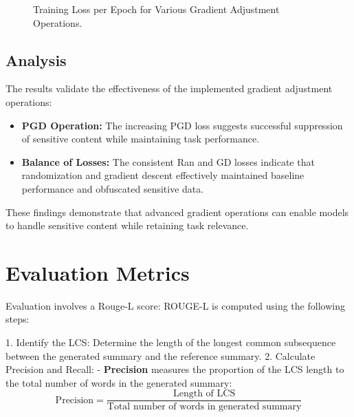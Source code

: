 \documentclass[11pt]{article}
\begin{document}
    \begin{figure}[h!]
        \centering
        \caption{Training Loss per Epoch for Various Gradient Adjustment Operations.}
        \label{fig:training-loss}
    \end{figure}

    \subsection{Analysis}
    The results validate the effectiveness of the implemented gradient adjustment operations:
    \begin{itemize}
        \item \textbf{PGD Operation:} The increasing PGD loss suggests successful suppression of sensitive content while maintaining task performance.
        \item \textbf{Balance of Losses:} The consistent Ran and GD losses indicate that randomization and gradient descent effectively maintained baseline performance and obfuscated sensitive data.
    \end{itemize}
    These findings demonstrate that advanced gradient operations can enable models to handle sensitive content while retaining task relevance.


    \section{Evaluation Metrics}
    Evaluation involves a Rouge-L score:
    ROUGE-L is computed using the following steps:

    1. Identify the LCS: Determine the length of the longest common subsequence between the generated summary and the reference summary.
    2. Calculate Precision and Recall:
    - \textbf{Precision} measures the proportion of the LCS length to the total number of words in the generated summary:
    \begin{equation}
        \text{Precision} = \frac{\text{Length of LCS}}{\text{Total number of words in generated summary}}
    \end{equation}
\end{document}
